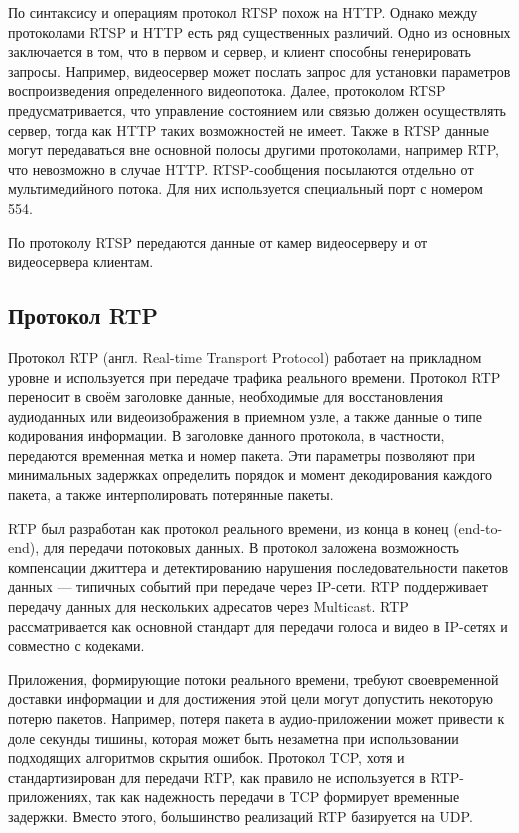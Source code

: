 По синтаксису и операциям протокол RTSP похож на HTTP. Однако между протоколами RTSP и HTTP есть ряд
существенных различий. Одно из основных заключается в том, что в первом и сервер, и клиент способны
генерировать запросы. Например, видеосервер может послать запрос для установки параметров
воспроизведения определенного видеопотока. Далее, протоколом RTSP предусматривается, что управление
состоянием или связью должен осуществлять сервер, тогда как HTTP таких возможностей не имеет.
Также в RTSP данные могут передаваться вне основной полосы другими протоколами,
например RTP, что невозможно в случае HTTP. RTSP-сообщения посылаются отдельно от мультимедийного
потока. Для них используется специальный порт с номером 554.

По протоколу RTSP передаются данные от камер видеосерверу и от видеосервера клиентам.

\subsection{Протокол RTP}
Протокол RTP (англ. Real-time Transport Protocol) работает на прикладном уровне и используется
при передаче трафика реального времени.
Протокол RTP переносит в своём заголовке данные, необходимые для восстановления аудиоданных или
видеоизображения в приемном узле, а также данные о типе кодирования информации. В заголовке данного
протокола, в частности, передаются временная метка и номер пакета. Эти параметры позволяют при
минимальных задержках определить порядок и момент декодирования каждого пакета, а также
интерполировать потерянные пакеты.

RTP был разработан как протокол реального времени, из конца в конец (end-to-end), для передачи
потоковых данных. В протокол заложена возможность компенсации джиттера и детектированию нарушения
последовательности пакетов данных — типичных событий при передаче через IP-сети. RTP поддерживает
передачу данных для нескольких адресатов через Multicast. RTP рассматривается как основной стандарт
для передачи голоса и видео в IP-сетях и совместно с кодеками.

Приложения, формирующие потоки реального времени, требуют своевременной доставки информации и для
достижения этой цели могут допустить некоторую потерю пакетов. Например, потеря пакета в
аудио-приложении может привести к доле секунды тишины, которая может быть незаметна при
использовании подходящих алгоритмов скрытия ошибок. Протокол TCP, хотя и стандартизирован для
передачи RTP, как правило не используется в RTP-приложениях, так как надежность передачи в TCP
формирует временные задержки. Вместо этого, большинство реализаций RTP базируется на UDP.


